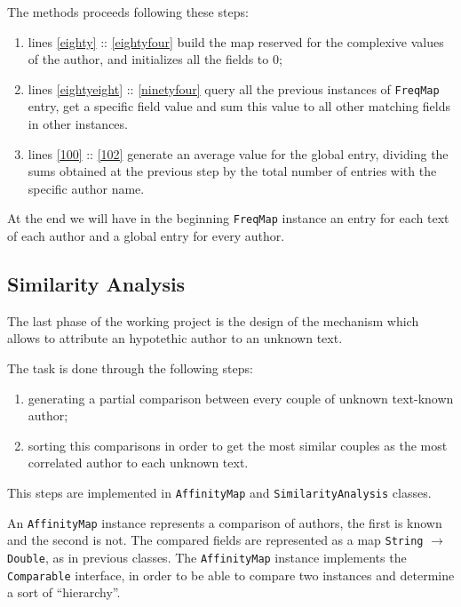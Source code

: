 \documentclass[a4paper,11pt, twoside]{article}
\begin{document}
	 The methods proceeds following these steps: \begin{enumerate}
	 	\item lines \ref{eighty} :: \ref{eightyfour} build the map reserved for the complexive values of the author, and initializes all the fields to 0;
	 	\item lines \ref{eightyeight} :: \ref{ninetyfour} query all the previous instances of \lstinline|FreqMap| entry, get a specific field value and sum this value to all other matching fields in other instances.
	 	\item lines \ref{100} :: \ref{102} generate an average value for the global entry, dividing the sums obtained at the previous step by the total number of entries with the specific author name.
	 \end{enumerate}
	 
	 \bigskip
	 \noindent
	 At the end we will have in the beginning \lstinline|FreqMap| instance an entry for each text of each author and a global entry for every author.
	
	\subsection{Similarity Analysis}
	The last phase of the working project is the design of the mechanism which allows to attribute an hypotethic author to an unknown text.
	
	The task is done through the following steps: \begin{enumerate}
		\item generating a partial comparison between every couple of unknown text-known author;
		\item sorting this comparisons in order to get the most similar couples as the most correlated author to each unknown text.
	\end{enumerate}

	This steps are implemented in \lstinline|AffinityMap| and \lstinline|SimilarityAnalysis| classes.
	
	 An \lstinline|AffinityMap| instance represents a comparison of authors, the first is known and the second is not. The compared fields are represented as a map \lstinline|String| $\to$ \lstinline|Double|, as in previous classes. The \lstinline|AffinityMap| instance implements the \lstinline|Comparable| interface, in order to be able to compare two instances and determine a sort of ``hierarchy''.
	 
\end{document}
